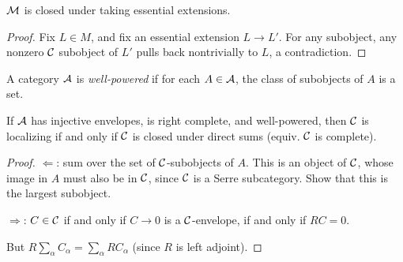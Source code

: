 \begin{por}
$\mathcal{M}$ is closed under taking essential extensions.
\end{por}
\begin{proof}
Fix $L \in M$, and fix an essential extension $L \to L'$. For any 
subobject, any nonzero $\mathcal{C}$ subobject of $L'$ pulls back 
nontrivially to $L$, a contradiction.
\end{proof}

\begin{definition}
A category $\mathcal{A}$ is \emph{well-powered} if for each $A \in
\mathcal{A}$, the class of subobjects of $A$ is a set.
\end{definition}

\begin{cor}
If $\mathcal{A}$ has injective envelopes, is right complete, and
well-powered, then $\mathcal{C}$ is localizing if and only if $\mathcal{C}$
is closed under direct sums (equiv. $\mathcal{C}$ is complete).
\end{cor}
\begin{proof}
\noindent $\Leftarrow$: sum over the set of $\mathcal{C}$-subobjects
of $A$. This is an object of $\mathcal{C}$, whose image in $A$ must
also be in $\mathcal{C}$, since $\mathcal{C}$ is a Serre subcategory. Show 
that this is the largest subobject.

\noindent $\Rightarrow$: $C \in \mathcal{C}$ if and only if $C \to 0$
is a $\mathcal{C}$-envelope, if and only if $RC = 0$.

But $R\sum_{\alpha} C_\alpha = \sum_{\alpha} RC_\alpha$ (since $R$
is left adjoint).
\end{proof}

